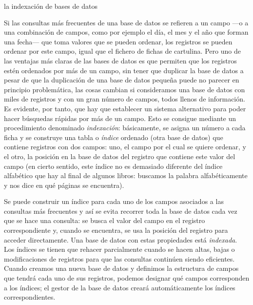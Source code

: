 \begin{persabermes}{la indexación de bases de datos} 

Si las consultas más frecuentes de una base de datos se refieren a un campo ---o a una combinación de campos, como por ejemplo el día, el mes y el año que forman una fecha--- que toma valores que se pueden ordenar, los registros se pueden ordenar por este campo, igual que el fichero de fichas de cartulina. Pero uno de las ventajas más claras de las bases de datos es que permiten que los registros estén ordenados por más de un campo, sin tener que duplicar la base de datos a pesar de que la duplicación de una base de datos pequeña puede no parecer en principio problemática, las cosas cambian si consideramos una base de datos con miles de registros y con un gran número de campos, todos llenos de información. Es evidente, por tanto, que hay que establecer un sistema alternativo para poder hacer búsquedas rápidas por más de un campo. Esto se consigue mediante un procedimiento denominado \emph{indexación}: básicamente, se asigna un número a cada ficha y se construye una tabla o \emph{índice} ordenado (otra base de datos) que contiene registros con dos campos: uno, el campo por el cual se quiere ordenar, y el otro, la posición en la base de datos del registro que contiene este valor del campo (en cierto sentido, este índice no es demasiado diferente del índice alfabético que hay al final de algunos libros: buscamos la palabra alfabéticamente y nos dice en qué páginas se encuentra). 

Se puede construir un índice para cada uno de los campos asociados a las consultas más frecuentes y así se evita recorrer toda la base de datos cada vez que se hace una consulta: se busca el valor del campo en el registro correspondiente y, cuando se encuentra, se usa la posición del registro para acceder directamente. Una base de datos con estas propiedades está \emph{indexada}. 
Los índices se tienen que rehacer parcialmente cuando se hacen altas, bajas o modificaciones de registros para que las consultas continúen siendo eficientes. Cuando creamos una nueva base de datos y definimos la estructura de campos que tendrá cada uno de sus registros, podemos designar qué campos corresponden a los índices; el gestor de la base de datos creará automáticamente los índices correspondientes. 


\end{persabermes}
